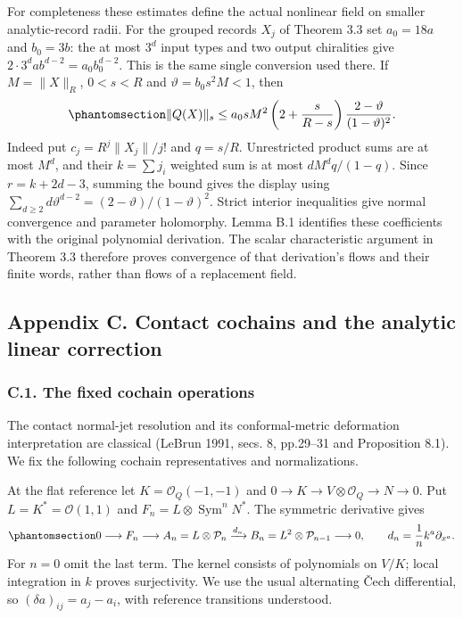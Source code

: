 \documentclass[
  english,
  11pt,
  reqno]{amsart}
\begin{document}
For completeness these estimates define the actual nonlinear field on
smaller analytic-record radii. For the grouped records \(X_j\) of
Theorem 3.3 set \(a_0=18a\) and \(b_0=3b\): the at most \(3^d\) input
types and two output chiralities give
\(2\cdot3^d a b^{d-2}=a_0b_0^{d-2}\). This is the same single conversion
used there. If \(M=\|X\|_R\), \(0<s<R\) and \(\vartheta=b_0s^2M<1\),
then
\begin{equation}\protect\phantomsection\label{eq:gg-budget-nonlinear-sum}{
 \|Q(X)\|_s
 \le a_0sM^2\left(2+\frac{s}{R-s}\right)
                     \frac{2-\vartheta}{(1-\vartheta)^2}.
}\end{equation} Indeed put \(c_j=R^j\|X_j\|/j!\) and \(q=s/R\).
Unrestricted product sums are at most \(M^d\), and their \(k=\sum j_i\)
weighted sum is at most \(dM^dq/(1-q)\). Since \(r=k+2d-3\), summing the
bound gives the display using
\(\sum_{d\ge2}d\vartheta^{d-2}=(2-\vartheta)/(1-\vartheta)^2\). Strict
interior inequalities give normal convergence and parameter holomorphy.
Lemma B.1 identifies these coefficients with the original polynomial
derivation. The scalar characteristic argument in Theorem 3.3 therefore
proves convergence of that derivation's flows and their finite words,
rather than flows of a replacement field.

\protect{}\label{app:gg-contact-linear-operators}

\subsection{Appendix C. Contact cochains and the analytic linear
correction}\label{appendix-c.-contact-cochains-and-the-analytic-linear-correction}

\protect{}\label{sec:gg-contact-cochain-repair}

\subsubsection{C.1. The fixed cochain
operations}\label{c.1.-the-fixed-cochain-operations}

The contact normal-jet resolution and its conformal-metric deformation
interpretation are classical (LeBrun 1991, secs. 8, pp.29--31 and
Proposition 8.1). We fix the following cochain representatives and
normalizations.

At the flat reference let \(K=\mathcal O_Q(-1,-1)\) and
\(0\to K\to V\otimes\mathcal O_Q\to N\to0\). Put
\(L=K^*=\mathcal O(1,1)\) and \(F_n=L\otimes\operatorname{Sym}^nN^*\).
The symmetric derivative gives
\begin{equation}\protect\phantomsection\label{eq:gg-contact-tautological-resolution}{
 0\longrightarrow F_n\longrightarrow
 A_n=L\otimes\mathcal P_n
 \xrightarrow{d_n}B_n=L^2\otimes\mathcal P_{n-1}
 \longrightarrow0,\qquad d_n=\frac1n k^a\partial_{x^a}.
}\end{equation} For \(n=0\) omit the last term. The kernel consists of
polynomials on \(V/K\); local integration in \(k\) proves surjectivity.
We use the usual alternating Čech differential, so
\((\delta a)_{ij}=a_j-a_i\), with reference transitions understood.
\end{document}

